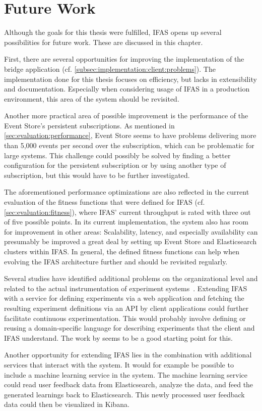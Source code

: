 %
\chapter{Future Work}
\label{ch:future-work}

Although the goals for this thesis were fulfilled, \ac{IFAS} opens up several possibilities for future work.
These are discussed in this chapter.

First, there are several opportunities for improving the implementation of the bridge application (cf. \cref{subsec:implementation:client:problems}).
The implementation done for this thesis focuses on efficiency, but lacks in extensibility and documentation.
Especially when considering usage of \ac{IFAS} in a production environment, this area of the system should be revisited.

Another more practical area of possible improvement is the performance of the Event Store's persistent subscriptions.
As mentioned in \cref{sec:evaluation:performance}, Event Store seems to have problems delivering more than 5,000 events per second over the subscription, which can be problematic for large systems.
This challenge could possibly be solved by finding a better configuration for the persistent subscription or by using another type of subscription, but this would have to be further investigated.

The aforementioned performance optimizations are also reflected in the current evaluation of the fitness functions that were defined for \ac{IFAS} (cf. \cref{sec:evaluation:fitness}), where \ac{IFAS}' current throughput is rated with three out of five possible points.
In its current implementation, the system also has room for improvement in other areas:
Scalability, latency, and especially availability can presumably be improved a great deal by setting up Event Store and Elasticsearch clusters within \ac{IFAS}.
In general, the defined fitness functions can help when evolving the \ac{IFAS} architecture further and should be revisited regularly.

Several studies have identified additional problems on the organizational level and related to the actual instrumentation of experiment systems~\cite{Lindgren2015,lindgren2015software,gutbrod2017software}.
Extending \ac{IFAS} with a service for defining experiments via a web application and fetching the resulting experiment definitions via an \ac{API} by client applications could further facilitate continuous experimentation.
This would probably involve defining or reusing a domain-specific language for describing experiments that the client and \ac{IFAS} understand.
The work by \citet{Bakshy2014} seems to be a good starting point for this.

Another opportunity for extending \ac{IFAS} lies in the combination with additional services that interact with the system.
It would for example be possible to include a machine learning service in the system.
The machine learning service could read user feedback data from Elasticsearch, analyze the data, and feed the generated learnings back to Elasticsearch.
This newly processed user feedback data could then be visualized in Kibana.
